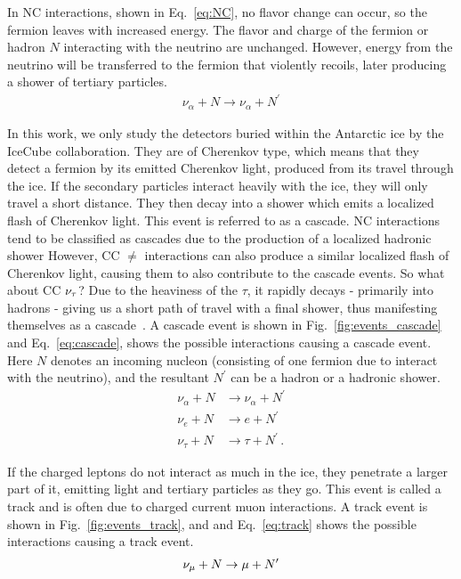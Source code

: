 In NC interactions, shown in Eq.~\ref{eq:NC}, no flavor change can occur, so the fermion leaves with increased energy.
The flavor and charge of the fermion or hadron $N$ interacting with the neutrino are unchanged. However, energy 
from the neutrino will be transferred to the fermion that violently recoils, later producing a shower of tertiary particles.
\begin{align}\label{eq:NC}
    \nu_\alpha + N \to \nu_\alpha + N^\prime
\end{align}

In this work, we only study the detectors buried within the Antarctic ice by the IceCube collaboration. 
They are of Cherenkov type, which means that they detect 
a fermion by its emitted Cherenkov light, produced from its travel through the ice. 
If the secondary particles interact heavily with the ice, they will only travel a short distance. They then decay
into a shower which emits a localized flash of Cherenkov light. This event is referred to as a cascade.
NC interactions tend to be classified as cascades due to the production of a localized hadronic shower
However, CC $\ne$ interactions can also produce a similar localized flash of Cherenkov light, causing them to also contribute 
to the cascade events. So what about CC $\nu_\tau$? Due to the heaviness of the $\tau$, it rapidly decays - primarily into hadrons - giving us a short path
of travel with a final shower, thus manifesting themselves as a cascade~\cite{DC2019tauappearance}. A cascade event 
is shown in Fig.~\ref{fig:events_cascade} and Eq.~\ref{eq:cascade}, shows the possible interactions causing a cascade event.
Here $N$ denotes an incoming nucleon (consisting of one fermion due to interact with the neutrino), and the resultant $N^\prime$ can be a hadron or
a hadronic shower.
\begin{align}\label{eq:cascade}
    \nu_\alpha + N &\to \nu_\alpha + N^\prime \nonumber \\
    \nu_e + N &\to e + N^\prime  \nonumber \\
    \nu_\tau + N &\to \tau + N^\prime\,.
\end{align}

If the charged leptons do not interact as much in the ice, they penetrate a larger part of it, emitting light and tertiary particles
as they go. This event is called a track and is often due to charged current muon interactions. A track event 
is shown in Fig.~\ref{fig:events_track}, and and Eq.~\ref{eq:track} shows the possible interactions causing a track event.
\begin{align}\label{eq:track}
    \nu_\mu + N \to \mu + N^\prime
\end{align}

